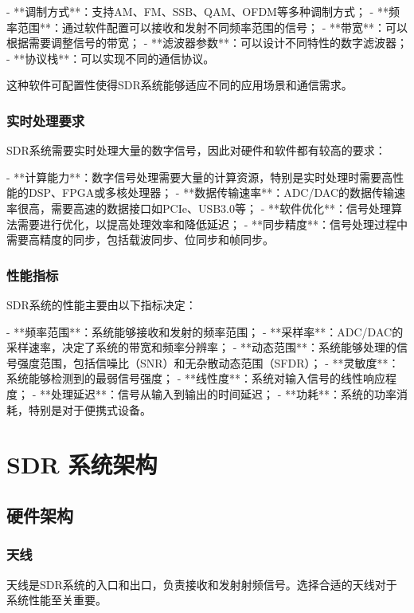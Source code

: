 ﻿\documentclass[UTF8]{ctexbook}
\begin{document}
- **调制方式**：支持AM、FM、SSB、QAM、OFDM等多种调制方式；
- **频率范围**：通过软件配置可以接收和发射不同频率范围的信号；
- **带宽**：可以根据需要调整信号的带宽；
- **滤波器参数**：可以设计不同特性的数字滤波器；
- **协议栈**：可以实现不同的通信协议。

这种软件可配置性使得SDR系统能够适应不同的应用场景和通信需求。

\subsection{实时处理要求}

SDR系统需要实时处理大量的数字信号，因此对硬件和软件都有较高的要求：

- **计算能力**：数字信号处理需要大量的计算资源，特别是实时处理时需要高性能的DSP、FPGA或多核处理器；
- **数据传输速率**：ADC/DAC的数据传输速率很高，需要高速的数据接口如PCIe、USB3.0等；
- **软件优化**：信号处理算法需要进行优化，以提高处理效率和降低延迟；
- **同步精度**：信号处理过程中需要高精度的同步，包括载波同步、位同步和帧同步。

\subsection{性能指标}

SDR系统的性能主要由以下指标决定：

- **频率范围**：系统能够接收和发射的频率范围；
- **采样率**：ADC/DAC的采样速率，决定了系统的带宽和频率分辨率；
- **动态范围**：系统能够处理的信号强度范围，包括信噪比（SNR）和无杂散动态范围（SFDR）；
- **灵敏度**：系统能够检测到的最弱信号强度；
- **线性度**：系统对输入信号的线性响应程度；
- **处理延迟**：信号从输入到输出的时间延迟；
- **功耗**：系统的功率消耗，特别是对于便携式设备。

\chapter{SDR 系统架构}

\section{硬件架构}

\subsection{天线}

天线是SDR系统的入口和出口，负责接收和发射射频信号。选择合适的天线对于系统性能至关重要。
\end{document}

